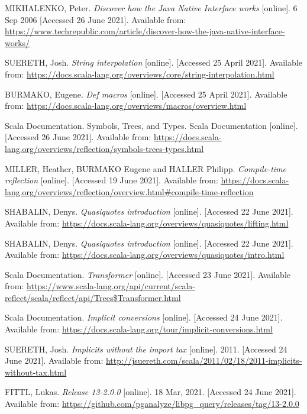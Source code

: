 \documentclass[thesis=B,english]{FITthesis}[2019/12/23]
\begin{document}
\begin{thebibliography}{9}
MIKHALENKO, Peter.
\textit{Discover how the Java Native Interface works} [online]. 6 Sep 2006  [Accessed 26 June 2021]. Available from:
\url{https://www.techrepublic.com/article/discover-how-the-java-native-interface-works/}

SUERETH, Josh. 
\textit {String interpolation} [online]. [Accessed 25 April 2021]. Available from: \url{https://docs.scala-lang.org/overviews/core/string-interpolation.html}

BURMAKO, Eugene. 
\textit {Def macros} [online]. [Accessed 25 April 2021]. Available from: \url{https://docs.scala-lang.org/overviews/macros/overview.html}

Scala Documentation.
Symbols, Trees, and Types. Scala Documentation [online]. [Accessed 26 June 2021]. Available from: \url{https://docs.scala-lang.org/overviews/reflection/symbols-trees-types.html} 


MILLER, Heather, BURMAKO Eugene and HALLER Philipp.
\textit {Compile-time reflection} [online]. [Accessed 19 June 2021]. Available from: \url{https://docs.scala-lang.org/overviews/reflection/overview.html\#compile-time-reflection}

SHABALIN, Denys.
\textit {Quasiquotes introduction} [online]. [Accessed 22 June 2021]. Available from:
\url{https://docs.scala-lang.org/overviews/quasiquotes/lifting.html}

SHABALIN, Denys.
\textit {Quasiquotes introduction} [online]. [Accessed 22 June 2021]. Available from:
\url{https://docs.scala-lang.org/overviews/quasiquotes/intro.html}

Scala Documentation.
\textit {Transformer} [online]. [Accessed 23 June 2021]. Available from:
\url{https://www.scala-lang.org/api/current/scala-reflect/scala/reflect/api/Trees$Transformer.html}

Scala Documentation.
\textit {Implicit conversions} [online]. [Accessed 24 June 2021]. Available from:
\url{https://docs.scala-lang.org/tour/implicit-conversions.html}

SUERETH, Josh.
\textit {Implicits without the import tax} [online]. 2011. [Accessed 24 June 2021]. Available from: \url{http://jsuereth.com/scala/2011/02/18/2011-implicits-without-tax.html}

FITTL, Lukas.
\textit {Release 13-2.0.0} [online]. 18 Mar, 2021. [Accessed 24 June 2021]. Available from:
\url{https://github.com/pganalyze/libpg\_query/releases/tag/13-2.0.0}

\end{thebibliography}
\appendix
\end{document}
